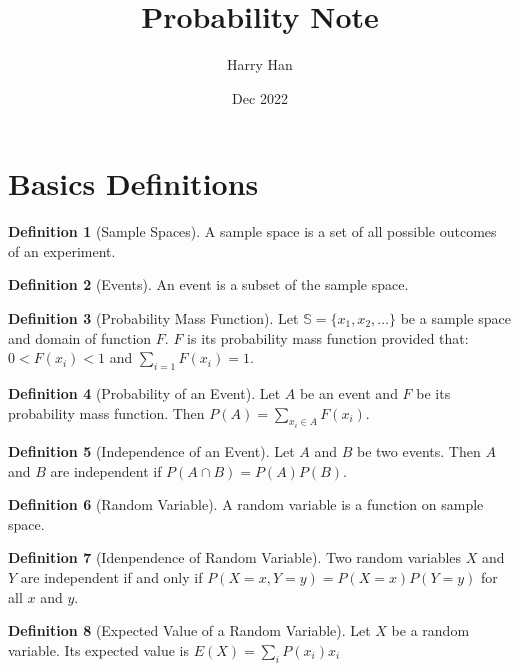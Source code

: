 \documentclass[12pt,a4paper]{article}
\title{Probability Note}
\author{Harry Han}
\date{Dec 2022}
\theoremstyle{definition}
\newtheorem{definition}{Definition}[section]
\begin{document}
\maketitle
\tableofcontents
\newpage

\section{Basics Definitions}
\begin{definition}[Sample Spaces]
	A sample space is a set of all possible outcomes of an experiment.
\end{definition}

\begin{definition}[Events]
	An event is a subset of the sample space.
\end{definition}

\begin{definition}[Probability Mass Function]
	Let 
	$ \mathbb{S} = \{x_1, x_2, \dots \}$ be a sample space and domain of function $F.$
	$F$ is its probability mass function provided that: $0<F(x_i)<1$ and $\sum_{i=1} F(x_i) = 1$.
\end{definition}

\begin{definition}[Probability of an Event]
	Let $A$ be an event and $F$ be its probability mass function.
	Then $P(A) = \sum_{x_i \in A} F(x_i)$.
\end{definition}

\begin{definition}[Independence of an Event]
	Let $A$ and $B$ be two events.
	Then $A$ and $B$ are independent if $P(A \cap B) = P(A)P(B)$.
\end{definition}

\begin{definition}[Random Variable]
	A random variable is a function on sample space.
\end{definition}

\begin{definition}[Idenpendence of Random Variable]
	Two random variables $X$ and $Y$ are independent if and only if $P(X=x, Y=y) = P(X=x)P(Y=y)$ for all $x$ and $y$.
\end{definition}

\begin{definition}[Expected Value of a Random Variable]
	Let $X$ be a random variable.
	Its expected value is $E(X)= \sum_i P(x_i)x_i$	
\end{definition}

	
\end{document}
